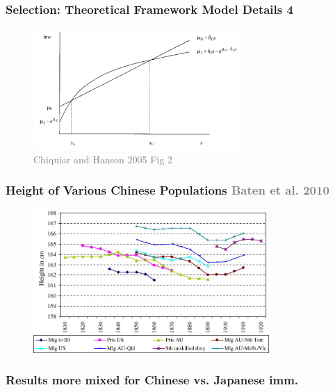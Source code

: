 \documentclass[xcolor=dvipsnames, compress, 12pt, aspectratio=169, handout]{beamer}
\begin{document}
\begin{frame}
    \label{theory4}
    \frametitle{Selection: Theoretical Framework Model Details 4 \hyperlink{theory_main}{}}
    \begin{figure}
        \includegraphics[width = 0.7\textwidth]{../../figs/slides/chiquiarhanson.png}
        \caption{\textcolor{gray}{Chiquiar and Hanson 2005 Fig 2}}
    \end{figure}
\end{frame}

\begin{frame}
    \label{baten_graph}
    \frametitle{Height of Various Chinese Populations \textcolor{gray}{Baten et al. 2010} \hyperlink{height2}{}}
    \centering
    \begin{figure}
        \includegraphics[width = 0.8\textwidth]{../../figs/slides/batenetal_heights.jpeg}
    \end{figure}
\end{frame}


\begin{frame}
    \label{reg_sel2}
    \frametitle{Results more mixed for Chinese vs. Japanese imm. \hyperlink{reg_sel1}{}}
    \centering
    \begin{table}
        \resizebox{0.9\textwidth}{!}{}
    \end{table}
\end{frame}
\end{document}
